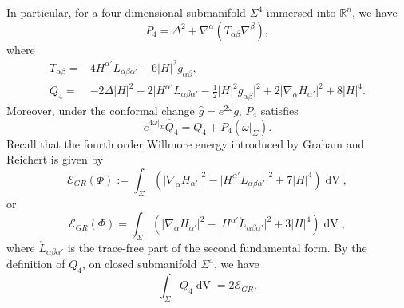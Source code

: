 \documentclass[11pt,letterpaper]{amsart}
\DeclareMathOperator{\dvol}{dV}
\newcommand{\mE}{\mathcal{E}}
\newcommand{\bR}{\mathbb{R}}
\theoremstyle{definition}
\theoremstyle{remark}
\numberwithin{equation}{section}
\begin{document}
In particular, for a four-dimensional submanifold $\Sigma^4$ immersed into $\bR^n$, we have
\begin{equation}
        P_4=\Delta^2+\nabla^{\alpha}\left(T_{\alpha\beta}\nabla^{\beta}\right),
    \end{equation}
where 
\begin{equation}
    \begin{split}
T_{\alpha\beta}=&4H^{\alpha'}L_{\alpha\beta\alpha'}-6|H|^2 g_{\alpha\beta},\\
Q_4=&-2\Delta |H|^2-2\big|H^{\alpha'}L_{\alpha\beta\alpha'}-\frac{1}{2}|H|^2g_{\alpha\beta}\big|^2+2\big|\nabla_{\alpha}H_{\alpha'}\big|^2+8|H|^4.
\end{split}
\end{equation}
Moreover, under the conformal change $\hat{g}=e^{2\omega}g$, $P_4$ satisfies
\begin{equation}\label{Trans of Q}
e^{4\omega|_{\Sigma}}\hat{Q}_4=Q_4+P_4\left(\omega|_{\Sigma}\right).
\end{equation}
Recall that the fourth order Willmore energy introduced by Graham and Reichert is given by
\begin{equation*}
    \mE_{GR}(\Phi):=\int_{\Sigma} \left(\big|\nabla_{\alpha}H_{\alpha'}\big|^2-\big|H^{\alpha'}L_{\alpha\beta\alpha'}\big|^2+7|H|^4\right)\dvol,
\end{equation*}
or
\begin{equation*}
    \mE_{GR}(\Phi)=\int_{\Sigma} \left(\big|\nabla_{\alpha}H_{\alpha'}\big|^2-\big|H^{\alpha'}\mathring{L}_{\alpha\beta\alpha'}\big|^2+3|H|^4\right)\dvol,
\end{equation*}
where $\mathring{L}_{\alpha\beta\alpha'}$ is the trace-free part of the second fundamental form. By the definition of $Q_4$, on closed submanifold $\Sigma^4$, we have
\begin{equation*}
    \int_{\Sigma} Q_4\dvol=2\mE_{GR}.
\end{equation*}    
\end{document}

